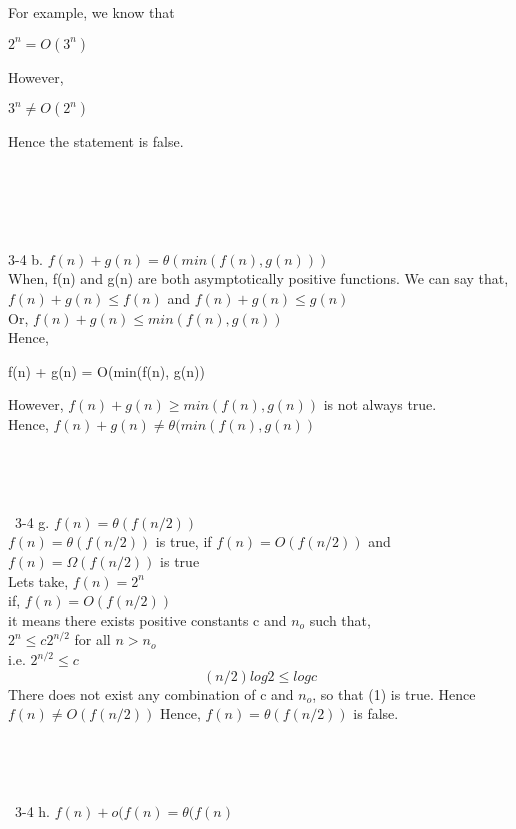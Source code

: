 \documentclass[10pt]{article}
\begin{document}
For example, we know that
\begin{center}
$2^n = O(3^n)$
\end{center}
However, \begin{center} $3^n \neq O(2^n)$ \end{center}
Hence the statement is false.\\\\\\\\\\\\
3-4 b. $f(n) + g(n) = \theta(min(f(n), g(n)))$\\
When, f(n) and g(n) are both asymptotically positive functions. We can say that, \\
$f(n) + g(n) \leq f(n) $ and $f(n) + g(n) \leq g(n)$\\
Or, $f(n) + g(n) \leq min(f(n), g(n))$\\
Hence, 
\begin{center}
f(n) + g(n) = O(min(f(n), g(n))
\end{center}
However, $f(n) + g(n) \geq min(f(n), g(n))$ is not always true.\\
Hence, $f(n) + g(n) \neq \theta(min(f(n), g(n))$
\\\\\\\\\\\
3-4 g. $f(n) = \theta(f(n/2))$\\
$f(n) = \theta(f(n/2))$ is true, if $f(n) = O(f(n/2))$ and $f(n) = \Omega(f(n/2))$ is true\\
Lets take, $f(n) = 2^n$\\
if, $f(n) = O(f(n/2))$\\
it means there exists positive constants c and $n_{o}$ such that,\\
$2^n \leq c2^{n/2}$ for all $n>n_{o}$\\
i.e. $2^{n/2} \leq c$\\
\begin{equation}
(n/2)log2 \leq logc
\end{equation}
There does not exist any combination of c and $n_{o}$, so that (1) is true. Hence $f(n) \neq O(f(n/2))$
Hence, $f(n) = \theta(f(n/2))$ is false.\\\\\\\\\\\
3-4 h. $f(n) + o(f(n) = \theta(f(n)$\\
\end{document}
